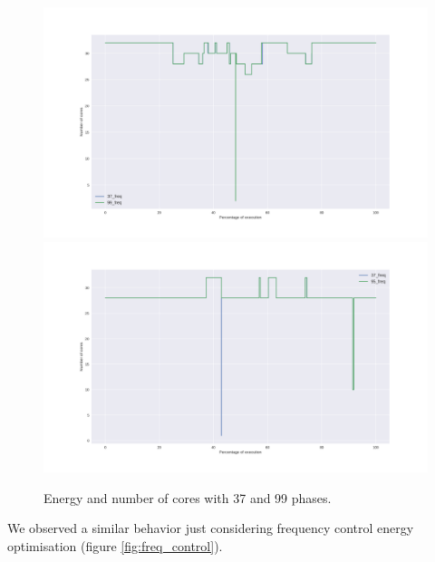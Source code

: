 \begin{figure}[h!]
\includegraphics[width=\columnwidth]{phases/figures/signals/completo_black_3_cores_signals_cmp.png}
\includegraphics[width=\columnwidth]{phases/figures/signals/completo_bodytrack_3_cores_signals_cmp.png}
\caption{Energy and number of cores with 37 and 99 phases.}
    \label{fig:cores_control}
\end{figure}

We observed a similar behavior just considering frequency control energy optimisation (figure \ref{fig:freq_control}).

